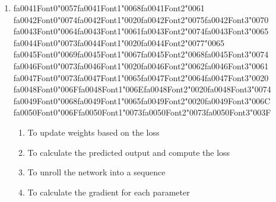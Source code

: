 \documentclass[12pt]{article}
\begin{document}
\begin{enumerate}[label=Q\arabic*.]
\item {\csname fa0041Font0\endcsname\char"0057}{\csname fa0041Font1\endcsname\char"0068}{\csname fa0041Font2\endcsname\char"0061} {\csname fa0042Font0\endcsname\char"0074}{\csname fa0042Font1\endcsname\char"0020}{\csname fa0042Font2\endcsname\char"0075}{\csname fa0042Font3\endcsname\char"0070} {\csname fa0043Font0\endcsname\char"0064}{\csname fa0043Font1\endcsname\char"0061}{\csname fa0043Font2\endcsname\char"0074}{\csname fa0043Font3\endcsname\char"0065} {\csname fa0044Font0\endcsname\char"0073}{\csname fa0044Font1\endcsname\char"0020}{\csname fa0044Font2\endcsname\char"0077}{\char"0065} {\csname fa0045Font0\endcsname\char"0069}{\csname fa0045Font1\endcsname\char"0067}{\csname fa0045Font2\endcsname\char"0068}{\csname fa0045Font3\endcsname\char"0074} {\csname fa0046Font0\endcsname\char"0073}{\csname fa0046Font1\endcsname\char"0020}{\csname fa0046Font2\endcsname\char"0062}{\csname fa0046Font3\endcsname\char"0061} {\csname fa0047Font0\endcsname\char"0073}{\csname fa0047Font1\endcsname\char"0065}{\csname fa0047Font2\endcsname\char"0064}{\csname fa0047Font3\endcsname\char"0020} {\csname fa0048Font0\endcsname\char"006F}{\csname fa0048Font1\endcsname\char"006E}{\csname fa0048Font2\endcsname\char"0020}{\csname fa0048Font3\endcsname\char"0074} {\csname fa0049Font0\endcsname\char"0068}{\csname fa0049Font1\endcsname\char"0065}{\csname fa0049Font2\endcsname\char"0020}{\csname fa0049Font3\endcsname\char"006C} {\csname fa0050Font0\endcsname\char"006F}{\csname fa0050Font1\endcsname\char"0073}{\csname fa0050Font2\endcsname\char"0073}{\csname fa0050Font3\endcsname\char"003F}
\begin{enumerate}[label=(\Alph*)]
    \item To update weights based on the loss
    \item To calculate the predicted output and compute the loss
    \item To unroll the network into a sequence
    \item To calculate the gradient for each parameter
\end{enumerate}

\end{enumerate}
\end{document}
